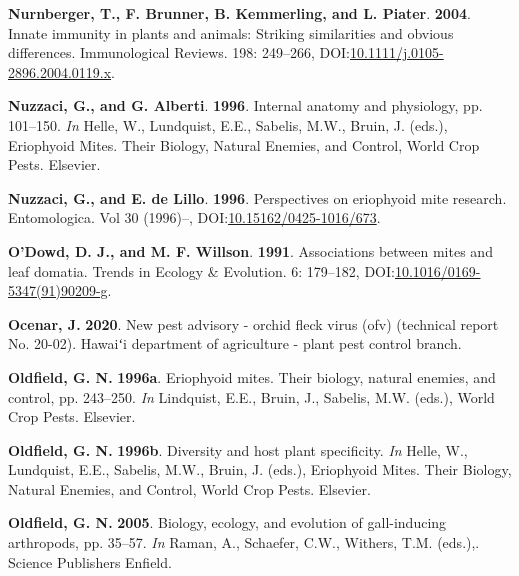 \documentclass[12pt,final,CPage]{ufthesis}
\newlength{\cslhangindent}
\newenvironment{CSLReferences}[2] %
{%
	\setlength{\parindent}{0pt}
	\ifodd #1 \everypar{\setlength{\hangindent}{\cslhangindent}}\ignorespaces\fi
	\ifnum #2 > 0
	\setlength{\parskip}{#2\baselineskip}
	\fi
}%
{}
\begin{document}
{\begin{CSLReferences}{1}{0}
  \leavevmode{}%
  \textbf{Nurnberger, T., F. Brunner, B. Kemmerling, and L. Piater}. \textbf{2004}. Innate immunity in plants and animals: Striking similarities and obvious differences. Immunological Reviews. 198: 249--266, DOI:\href{https://doi.org/10.1111/j.0105-2896.2004.0119.x}{10.1111/j.0105-2896.2004.0119.x}.

  \leavevmode{}%
  \textbf{Nuzzaci, G., and G. Alberti}. \textbf{1996}. Internal anatomy and physiology, pp. 101--150. \emph{In} Helle, W., Lundquist, E.E., Sabelis, M.W., Bruin, J. (eds.), Eriophyoid Mites. Their Biology, Natural Enemies, and Control, World Crop Pests. Elsevier.

  \leavevmode{}%
  \textbf{Nuzzaci, G., and E. de Lillo}. \textbf{1996}. Perspectives on eriophyoid mite research. Entomologica. Vol 30 (1996)--, DOI:\href{https://doi.org/10.15162/0425-1016/673}{10.15162/0425-1016/673}.

  \leavevmode{}%
  \textbf{O'Dowd, D. J., and M. F. Willson}. \textbf{1991}. Associations between mites and leaf domatia. Trends in Ecology {\&} Evolution. 6: 179--182, DOI:\href{https://doi.org/10.1016/0169-5347(91)90209-g}{10.1016/0169-5347(91)90209-g}.

  \leavevmode{}%
  \textbf{Ocenar, J.} \textbf{2020}. New pest advisory - orchid fleck virus (ofv) (technical report No. 20-02). Hawaiʻi department of agriculture - plant pest control branch.

  \leavevmode{}%
  \textbf{Oldfield, G. N.} \textbf{1996a}. Eriophyoid mites. Their biology, natural enemies, and control, pp. 243--250. \emph{In} Lindquist, E.E., Bruin, J., Sabelis, M.W. (eds.), World Crop Pests. Elsevier.

  \leavevmode{}%
  \textbf{Oldfield, G. N.} \textbf{1996b}. Diversity and host plant specificity. \emph{In} Helle, W., Lundquist, E.E., Sabelis, M.W., Bruin, J. (eds.), Eriophyoid Mites. Their Biology, Natural Enemies, and Control, World Crop Pests. Elsevier.

  \leavevmode{}%
  \textbf{Oldfield, G. N.} \textbf{2005}. Biology, ecology, and evolution of gall-inducing arthropods, pp. 35--57. \emph{In} Raman, A., Schaefer, C.W., Withers, T.M. (eds.),. Science Publishers Enfield.


\end{CSLReferences}}
\end{document}
